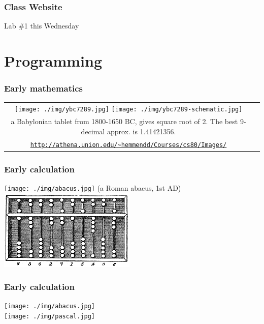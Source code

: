 \documentclass[11pt]{beamer}
\begin{document}
\begin{frame}[plain,c]
  \frametitle{Class Website}
  \Enlarge

  \begin{center}
    \textcolor{\CSBase}{\Huge Lab \#1 this Wednesday}
  \end{center}
\end{frame}





\section{Programming}

\begin{frame}[fragile]
  \frametitle{Early mathematics}

  \begin{tabular}{cc}
  \texttt{[image: ./img/ybc7289.jpg]}
  \texttt{[image: ./img/ybc7289-schematic.jpg]}\\
  {\tiny a Babylonian tablet from 1800-1650 BC, gives square root of 2. The best 9-decimal approx. is 1.41421356.}\\
  \textcolor{\CSBase}{\tiny \texttt{\url{http://athena.union.edu/~hemmendd/Courses/cs80/Images/}}}
  \end{tabular}
\end{frame}


\begin{frame}[fragile]
  \frametitle{Early calculation}

  \texttt{[image: ./img/abacus.jpg]} (a Roman abacus, 1st AD)\\ \pause
  \includegraphics[height=0.35\textheight]{./img/Abacus_cn.png} \\
\end{frame}


\iffalse

\begin{frame}[fragile]
  \frametitle{Early calculation}
  \texttt{[image: ./img/abacus.jpg]} \\
  \texttt{[image: ./img/pascal.jpg]}
\end{frame}
\end{document}
